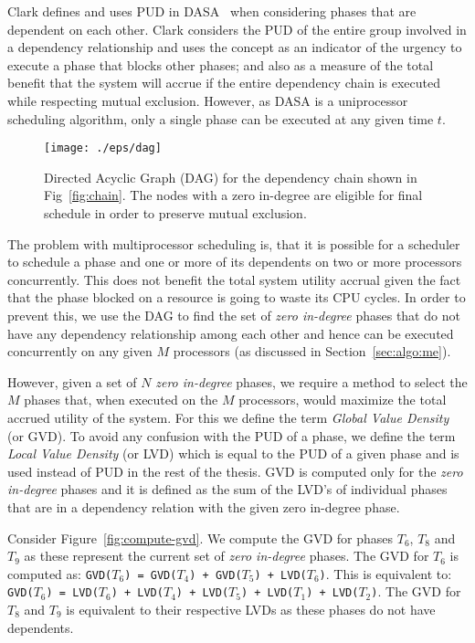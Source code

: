 \documentclass[12pt,dvips]{report}
\begin{document}
Clark defines and uses PUD in DASA~\cite{DASA} when considering phases that are dependent on each other. Clark considers the PUD of the entire group involved in a dependency relationship and uses the concept as an indicator of the urgency to execute a phase that blocks other phases; and also as a measure of the total benefit that the system will accrue if the entire dependency chain is executed while respecting mutual exclusion. However, as DASA is a uniprocessor scheduling algorithm, only a single phase can be executed at any given time $t$.

\begin{figure} [htpb]
  \centering
   \texttt{[image: ./eps/dag]}
  \caption{Directed Acyclic Graph (DAG) for the dependency chain shown in Fig~\ref{fig:chain}. The nodes with a
  zero in-degree are eligible for final schedule in order to preserve mutual exclusion.}
  \label{fig:dag}
\end{figure}

The problem with multiprocessor scheduling is, that it is possible for a scheduler to schedule a phase and one or more of its dependents on two or more processors concurrently. This does not benefit the total system utility accrual given the fact that the phase blocked on a resource is going to waste its CPU cycles. In order to prevent this, we use the DAG to find the set of \textit{zero in-degree} phases that do not have any dependency relationship among each other and hence can be executed concurrently on any given $M$ processors (as discussed in Section~\ref{sec:algo:me}).

However, given a set of $N$ \textit{zero in-degree} phases, we require a method to select the $M$ phases that, when executed on the $M$ processors, would maximize the total accrued utility of the system. For this we define the term \textit{Global Value Density} (or GVD). To avoid any confusion with the PUD of a phase, we define the term \textit{Local Value Density} (or LVD) which is equal to the PUD of a given phase and is used instead of PUD in the rest of the thesis. GVD is computed only for the \textit{zero in-degree} phases and it is defined as the sum of the LVD's of individual phases that are in a dependency relation with the given zero in-degree phase.

Consider Figure~\ref{fig:compute-gvd}. We compute the GVD for phases $T_6$, $T_8$ and $T_9$ as these represent the current set of \textit{zero in-degree} phases. The GVD for $T_6$ is computed as: \texttt{GVD($T_6$) = GVD($T_4$) + GVD($T_5$) + LVD($T_6$)}. This is equivalent to: \texttt{GVD($T_6$) = LVD($T_6$) + LVD($T_4$) + LVD($T_5$) + LVD($T_1$) + LVD($T_2$)}. The GVD for $T_8$ and $T_9$ is equivalent to their respective LVDs as these phases do not have dependents.
\end{document}
